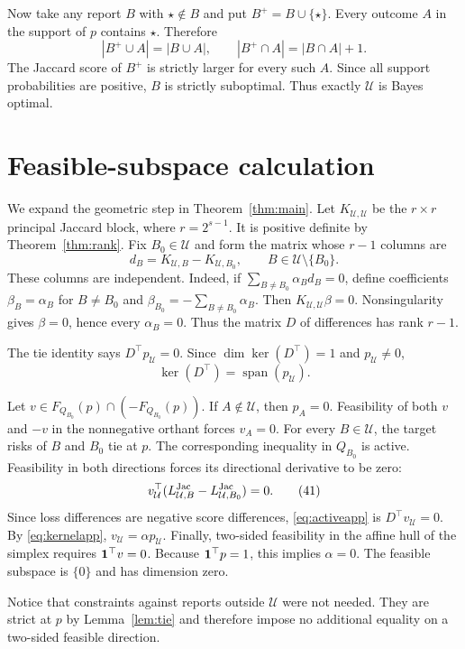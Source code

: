 Now take any report $B$ with $\star\notin B$ and put
$B^+=B\cup\{\star\}$. Every outcome $A$ in the support of $p$ contains
$\star$. Therefore
\[
 |B^+\cup A|=|B\cup A|,
 \qquad
 |B^+\cap A|=|B\cap A|+1.
\]
The Jaccard score of $B^+$ is strictly larger for every such $A$. Since all
support probabilities are positive, $B$ is strictly suboptimal. Thus exactly
$\mathcal U$ is Bayes optimal.

\section{Feasible-subspace calculation}
\label{app:feasible}

We expand the geometric step in Theorem~\ref{thm:main}. Let
$K_{\mathcal U,\mathcal U}$ be the $r\times r$ principal Jaccard block, where
$r=2^{s-1}$. It is positive definite by Theorem~\ref{thm:rank}. Fix
$B_0\in\mathcal U$ and form the matrix whose $r-1$ columns are
\[
 d_B=K_{\mathcal U,B}-K_{\mathcal U,B_0},
 \qquad B\in\mathcal U\setminus\{B_0\}.
 \tag{39}\label{eq:dBapp}
\]
These columns are independent. Indeed, if
$\sum_{B\ne B_0}\alpha_Bd_B=0$, define coefficients $\beta_B=\alpha_B$ for
$B\ne B_0$ and $\beta_{B_0}=-\sum_{B\ne B_0}\alpha_B$. Then
$K_{\mathcal U,\mathcal U}\beta=0$. Nonsingularity gives $\beta=0$, hence
every $\alpha_B=0$. Thus the matrix $D$ of differences has rank $r-1$.

The tie identity says $D^\top p_{\mathcal U}=0$. Since
$\dim\ker(D^\top)=1$ and $p_{\mathcal U}\ne0$,
\[
 \ker(D^\top)=\operatorname{span}(p_{\mathcal U}).
 \tag{40}\label{eq:kernelapp}
\]

Let $v\in F_{Q_{B_0}}(p)\cap(-F_{Q_{B_0}}(p))$. If $A\notin\mathcal U$,
then $p_A=0$. Feasibility of both $v$ and $-v$ in the nonnegative orthant
forces $v_A=0$. For every $B\in\mathcal U$, the target risks of $B$ and
$B_0$ tie at $p$. The corresponding inequality in $Q_{B_0}$ is active.
Feasibility in both directions forces its directional derivative to be zero:
\[
 v_{\mathcal U}^\top
 (L^{\rm Jac}_{\mathcal U,B}-L^{\rm Jac}_{\mathcal U,B_0})=0.
 \tag{41}\label{eq:activeapp}
\]
Since loss differences are negative score differences,
\eqref{eq:activeapp} is $D^\top v_{\mathcal U}=0$. By
\eqref{eq:kernelapp}, $v_{\mathcal U}=\alpha p_{\mathcal U}$. Finally,
two-sided feasibility in the affine hull of the simplex requires
$\mathbf 1^\top v=0$. Because $\mathbf 1^\top p=1$, this implies $\alpha=0$. The feasible
subspace is $\{0\}$ and has dimension zero.

Notice that constraints against reports outside $\mathcal U$ were not needed.
They are strict at $p$ by Lemma~\ref{lem:tie} and therefore impose no
additional equality on a two-sided feasible direction.

